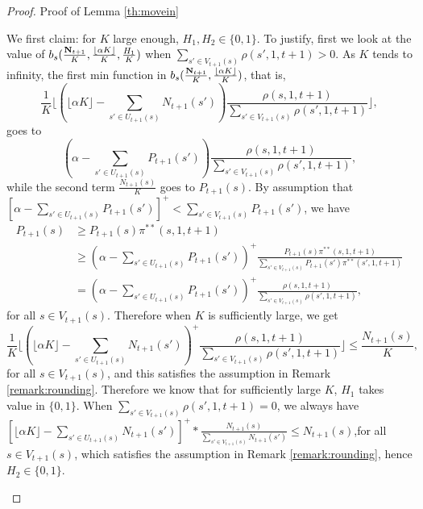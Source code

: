 \begin{proof}{Proof of Lemma \ref{th:movein}}
\begin{itemize}
We first claim: for $K$ large enough, $H_1,H_2\in\{0,1\}$. To justify, first we look at the value of $b_s(\frac{\mathbf{N}_{t+1}}{K},\frac{\lfloor\alpha K\rfloor}{K},\frac{H_1}{K})$ when $\sum_{s'\in V_{t+1}(s)}\rho(s',1,t+1)>0$.  
As $K$ tends to infinity, the first min function in $b_s(\frac{\mathbf{N}_{t+1}}{K},\frac{\lfloor\alpha K\rfloor}{K})$, that is,  $$\frac{1}{K}\Big\lfloor (\lfloor\alpha K\rfloor-\sum_{s'\in U_{t+1}(s)}N_{t+1}(s'))\frac{\rho(s,1,t+1)}{\sum_{s'\in V_{t+1}(s)}\rho(s',1,t+1)}\Big\rfloor,$$ 
goes to $$ (\alpha -\sum_{s'\in U_{t+1}(s)}P_{t+1}(s'))\frac{\rho(s,1,t+1)}{\sum_{s'\in V_{t+1}(s)}\rho(s',1,t+1)},$$
 while the second term $\frac{N_{t+1}(s)}{K}$ goes to $P_{t+1}(s)$. 
 By assumption that $[\alpha -\sum_{s'\in U_{t+1}(s)}P_{t+1}(s')]^+ < \sum_{s'\in V_{t+1}(s)}P_{t+1}(s')$, we have
\begin{align*}
P_{t+1}(s) & \geq P_{t+1}(s)\pi^{**}(s,1,t+1)\\
&\geq (\alpha -\sum_{s'\in U_{t+1}(s)}P_{t+1}(s'))^+\frac{P_{t+1}(s)\pi^{**}(s,1,t+1)}{\sum_{s'\in V_{t+1}(s)}P_{t+1}(s')\pi^{**}(s',1,t+1)}\\
&=(\alpha -\sum_{s'\in U_{t+1}(s)}P_{t+1}(s'))^+\frac{\rho(s,1,t+1)}{\sum_{s'\in V_{t+1}(s)}\rho(s',1,t+1)},
\end{align*}
for all $s\in V_{t+1}(s)$. Therefore when $K$ is sufficiently large, we get
$$\frac{1}{K}\Big\lfloor (\lfloor\alpha K\rfloor-\sum_{s'\in U_{t+1}(s)}N_{t+1}(s'))^+\frac{\rho(s,1,t+1)}{\sum_{s'\in V_{t+1}(s)}\rho(s',1,t+1)}\Big\rfloor\leq\frac{N_{t+1}(s)}{K},
$$ 
for all $s\in V_{t+1}(s)$, and this satisfies the assumption in Remark \ref{remark:rounding}. Therefore we know that for sufficiently large $K$, $H_1$ takes value in $\{0,1\}$. 
When $\sum_{s'\in V_{t+1}(s)}\rho(s',1,t+1)=0$, we always have $[\lfloor\alpha K\rfloor-\sum_{s'\in U_{t+1}(s)}N_{t+1}(s')]^+*\frac{N_{t+1}(s)}{\sum_{s'\in V_{t+1}(s)}N_{t+1}(s')} \leq N_{t+1}(s)$,for all $s\in V_{t+1}(s)$, which satisfies the assumption in Remark \ref{remark:rounding}, hence $H_2\in\{0,1\}$. 


\end{itemize}
\end{proof}
